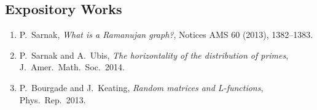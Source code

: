 \subsection*{Expository Works}
\begin{enumerate}
    \item P.\ Sarnak, \textit{What is a Ramanujan graph?}, Notices AMS 60 (2013), 1382--1383.
    \item P.\ Sarnak and A.\ Ubis, \textit{The horizontality of the distribution of primes}, J.\ Amer.\ Math.\ Soc.\ 2014.
    \item P.\ Bourgade and J.\ Keating, \textit{Random matrices and L-functions}, Phys.\ Rep.\ 2013.
\end{enumerate}

